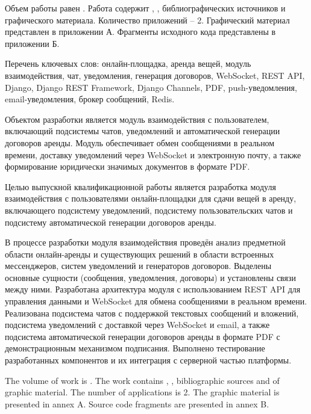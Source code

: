 
Объем работы равен . Работа содержит , ,  библиографических источников и  графического материала. Количество приложений – 2. Графический материал представлен в приложении А. Фрагменты исходного кода представлены в приложении Б.

Перечень ключевых слов: онлайн-площадка, аренда вещей, модуль взаимодействия, чат, уведомления, генерация договоров, WebSocket, REST API, Django, Django REST Framework, Django Channels, PDF, push-уведомления, email-уведомления, брокер сообщений, Redis.

Объектом разработки является модуль взаимодействия с пользователем, включающий подсистемы чатов, уведомлений и автоматической генерации договоров аренды. Модуль обеспечивает обмен сообщениями в реальном времени, доставку уведомлений через WebSocket и электронную почту, а также формирование юридически значимых документов в формате PDF.

Целью выпускной квалификационной работы является разработка модуля взаимодействия с пользователями онлайн-площадки для сдачи вещей в аренду, включающего подсистему уведомлений, подсистему пользовательских чатов и подсистему автоматической генерации договоров аренды.

В процессе разработки модуля взаимодействия проведён анализ предметной области онлайн-аренды и существующих решений в области встроенных мессенджеров, систем уведомлений и генераторов договоров. Выделены основные сущности (сообщения, уведомления, договоры) и установлены связи между ними. Разработана архитектура модуля с использованием REST API для управления данными и WebSocket для обмена сообщениями в реальном времени. Реализована подсистема чатов с поддержкой текстовых сообщений и вложений, подсистема уведомлений с доставкой через WebSocket и email, а также подсистема автоматической генерации договоров аренды в формате PDF с демонстрационным механизмом подписания. Выполнено тестирование разработанных компонентов и их интеграция с серверной частью платформы.


The volume of work is . The work contains , ,  bibliographic sources and  of graphic material. The number of applications is 2. The graphic material is presented in annex A. Source code fragments are presented in annex B.

